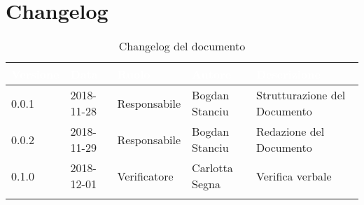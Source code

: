 \newpage

\section{Changelog}

\begin{center}
\begin{longtable}[c]{|m{}|m{}|m{}|m{}|p{}|}
\hline
\rowcolor{bluelogo}\textbf{\textcolor{white}{Versione}} & \textbf{\textcolor{white}{Data}} & \textbf{\textcolor{white}{Ruolo}} & \textbf{\textcolor{white}{Autore}} & \textbf{\textcolor{white}{Descrizione}}\\
\hline \hline
\endfirsthead
0.0.1 & 2018-11-28  & Responsabile & Bogdan Stanciu& Strutturazione del Documento \\
\hline
\rowcolor{grigio}0.0.2 & 2018-11-29 & Responsabile & Bogdan Stanciu & Redazione del Documento \\
\hline
0.1.0 & 2018-12-01  & Verificatore & Carlotta Segna & Verifica verbale \\
\hline
\caption{Changelog del documento}
\end{longtable}
\end{center}
